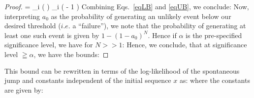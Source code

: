 {\begin{proof}
{  = \sum_i \log  \left  (    \right ) \leqq \sum_i \left  (  - 1 \right ) \leqq {}\theta
}%
Combining Eqs.~\ref{eqLB} and \ref{eqUB}, we conclude:
%
Now, interpreting $a_0$ as the probability of generating an unlikely event below our desired threshold ($i.e.$ a ``failure''), we note that the probability of generating at least one such event is given by $1-(1-a_0)^N$. Hence if $\alpha$ is the pre-specified significance level, we have for $N >> 1 $:
%
Hence, we conclude, that at significance level $\geqq \alpha$, we have the bounds:
%
\end{proof}
\begin{rem}
This bound can be rewritten in terms of the log-likelihood of the spontaneous jump and  constants independent of the  initial sequence $x$ as:
%
where the constants are given by:
%
\end{rem}










}